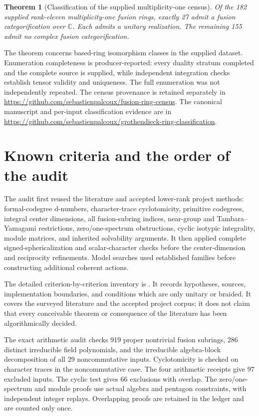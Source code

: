 \documentclass[11pt,a4paper]{article}
\newtheorem{theorem}{Theorem}
\begin{document}
\begin{theorem}[Classification of the supplied multiplicity-one census]
Of the 182 supplied rank-eleven multiplicity-one fusion rings, exactly 27
admit a fusion categorification over $\mathbb C$. Each admits a unitary
realization. The remaining 155 admit no complex fusion categorification.
\end{theorem}
The theorem concerns based-ring isomorphism classes in the supplied dataset.
Enumeration completeness is producer-reported: every duality stratum
completed and the complete source is supplied, while independent integration
checks establish tensor validity and uniqueness. The full enumeration was
not independently repeated. The census provenance is retained separately in
\url{https://github.com/sebastienpalcoux/fusion-ring-census}.
The canonical manuscript and per-input classification evidence are in
\url{https://github.com/sebastienpalcoux/grothendieck-ring-classification}.

\section{Known criteria and the order of the audit}
The audit first reused the literature and accepted lower-rank project methods:
formal-codegree d-numbers, character-trace cyclotomicity, primitive codegrees,
integral center dimensions, all fusion-subring indices, near-group and
Tambara--Yamagami restrictions, zero/one-spectrum obstructions, cyclic
isotypic integrality, module matrices, and inherited solvability arguments.
It then applied complete signed-sphericalization and scalar-character checks
before the center-dimension and reciprocity refinements. Model searches used
established families before constructing additional coherent actions.

The detailed criterion-by-criterion inventory is
. It records hypotheses,
sources, implementation boundaries, and conditions which are only unitary or
braided. It covers the surveyed literature and the accepted project corpus;
it does not claim that every conceivable theorem or consequence of the
literature has been algorithmically decided.

The exact arithmetic audit checks 919 proper nontrivial fusion subrings,
286 distinct irreducible field polynomials, and the irreducible algebra-block
decomposition of all 29 noncommutative inputs. Cyclotomicity is checked on
character traces in the noncommutative case. The four arithmetic receipts give
97 excluded inputs. The cyclic test gives 66 exclusions with overlap. The
zero/one-spectrum and module proofs use actual algebra and pentagon
constraints, with independent integer replays. Overlapping proofs are retained
in the ledger and are counted only once.
\end{document}
